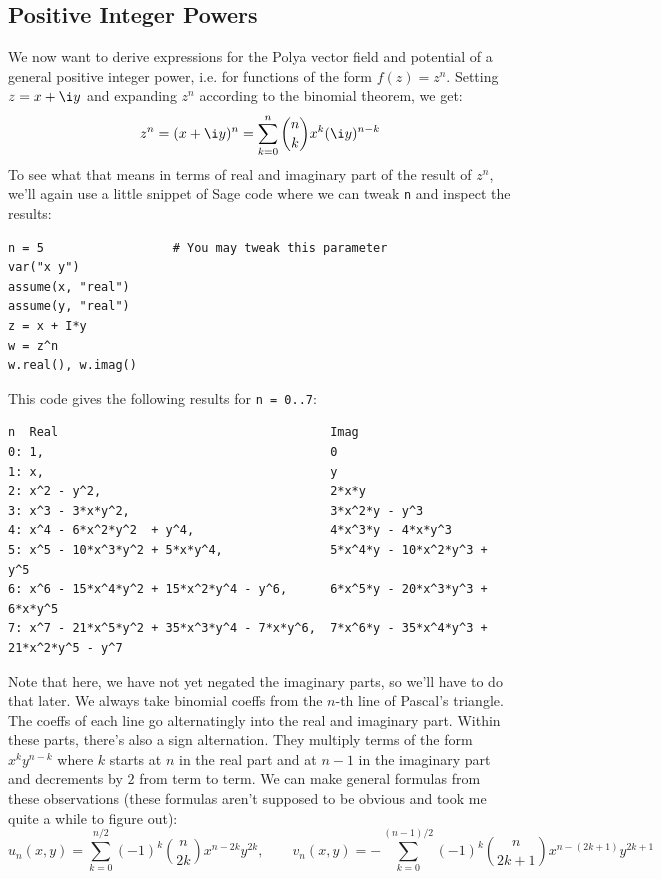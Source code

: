 \documentclass[12pt]{article}
\begin{document}
\subsection{Positive Integer Powers}
We now want to derive expressions for the Polya vector field and potential of a general positive integer power, i.e. for functions of the form $f(z) = z^n$. Setting $z = x + \i y$ and expanding $z^n$ according to the binomial theorem, we get:
\begin{equation}
	z^n = (x + \i y)^n = \sum_{k=0}^n \binom{n}{k}  x^k (\i y)^{n-k}
\end{equation}
To see what that means in terms of real and imaginary part of the result of $z^n$, we'll again use a little snippet of Sage code where we can tweak \texttt{n} and inspect the results:
\begin{verbatim}
n = 5	               # You may tweak this parameter
var("x y")
assume(x, "real")
assume(y, "real")
z = x + I*y
w = z^n
w.real(), w.imag()
\end{verbatim}
This code gives the following results for \texttt{n = 0..7}:
\begin{verbatim}
n  Real                                      Imag
0: 1,                                        0 
1: x,                                        y
2: x^2 - y^2,                                2*x*y
3: x^3 - 3*x*y^2,                            3*x^2*y - y^3
4: x^4 - 6*x^2*y^2  + y^4,                   4*x^3*y - 4*x*y^3
5: x^5 - 10*x^3*y^2 + 5*x*y^4,               5*x^4*y - 10*x^2*y^3 + y^5
6: x^6 - 15*x^4*y^2 + 15*x^2*y^4 - y^6,      6*x^5*y - 20*x^3*y^3 + 6*x*y^5
7: x^7 - 21*x^5*y^2 + 35*x^3*y^4 - 7*x*y^6,  7*x^6*y - 35*x^4*y^3 + 21*x^2*y^5 - y^7
\end{verbatim}
Note that here, we have not yet negated the imaginary parts, so we'll have to do that later. We always take binomial coeffs from the $n$-th line of Pascal's triangle. The coeffs of each line go alternatingly into the real and imaginary part. Within these parts, there's also a sign alternation. They multiply terms of the form $x^k y^{n-k}$ where $k$ starts at $n$ in the real part and at $n-1$ in the imaginary part and decrements by $2$ from term to term. We can make general formulas from these observations (these formulas aren't supposed to be obvious and took me quite a while to figure out):
\begin{equation}
\label{Eq:PolyaFieldPositivePowers}
\boxed{		
	u_n(x,y) = \sum_{k=0}^{n/2} (-1)^k \binom{n}{2 k} x^{n-2k} y^{2k}
	,\qquad
	v_n(x,y) = -\sum_{k=0}^{(n-1)/2} (-1)^k \binom{n}{2k+1} x^{n-(2k+1)} y^{2k+1}
}
\end{equation}
\end{document}
